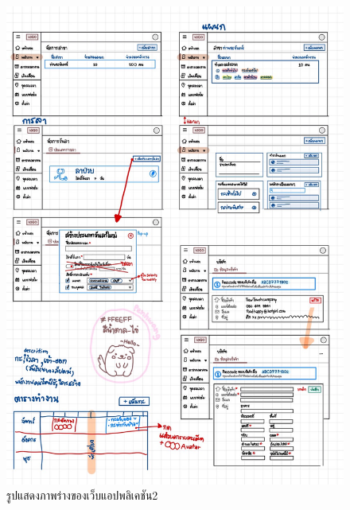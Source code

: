 \begin{figure}
  \begin{center}
    \includegraphics[width=14cm,keepaspectratio]{./images/design4.jpg}
  \end{center}
  \caption[รูปแสดงภาพร่างของเว็บแอปพลิเคชัน2]{รูปแสดงภาพร่างของเว็บแอปพลิเคชัน2} 
  
\end{figure}

